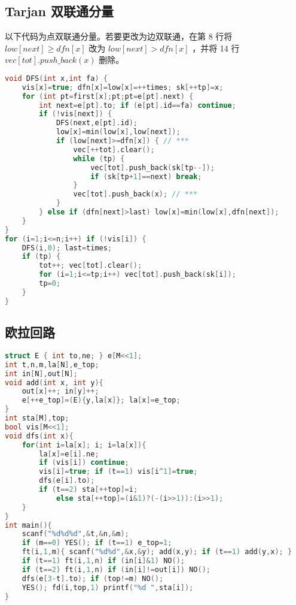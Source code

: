 \documentclass[landscape,a4paper]{article}
\begin{document}
\subsection{Tarjan 双联通分量}

以下代码为点双联通分量。若要更改为边双联通，在第 8 行将 $low[next] \geq dfn[x]$ 改为 $low[next] > dfn[x]$ ，并将 14 行 $vec[tot].push\_back(x)$ 删除。

\begin{lstlisting}[language=C++]
void DFS(int x,int fa) {
	vis[x]=true; dfn[x]=low[x]=++times; sk[++tp]=x;
	for (int pt=first[x];pt;pt=e[pt].next) {
		int next=e[pt].to; if (e[pt].id==fa) continue;
		if (!vis[next]) {
			DFS(next,e[pt].id);
			low[x]=min(low[x],low[next]);
			if (low[next]>=dfn[x]) { // ***
				vec[++tot].clear();
				while (tp) {
					vec[tot].push_back(sk[tp--]);
					if (sk[tp+1]==next) break;
				}
				vec[tot].push_back(x); // ***
			}
		} else if (dfn[next]>last) low[x]=min(low[x],dfn[next]);
	}
}
for (i=1;i<=n;i++) if (!vis[i]) {
	DFS(i,0); last=times;
	if (tp)	{
		tot++; vec[tot].clear();
		for (i=1;i<=tp;i++) vec[tot].push_back(sk[i]);
		tp=0;
	}
}
\end{lstlisting}

\subsection{欧拉回路}
\begin{lstlisting}[language=C++]
struct E { int to,ne; } e[M<<1];
int t,n,m,la[N],e_top;
int in[N],out[N];
void add(int x, int y){
	out[x]++; in[y]++;
	e[++e_top]=(E){y,la[x]}; la[x]=e_top;
}
int sta[M],top;
bool vis[M<<1];
void dfs(int x){
	for(int i=la[x]; i; i=la[x]){
		la[x]=e[i].ne;
		if (vis[i]) continue;
		vis[i]=true; if (t==1) vis[i^1]=true;		
		dfs(e[i].to);
		if (t==2) sta[++top]=i;
			else sta[++top]=(i&1)?(-(i>>1)):(i>>1);
	}
}
int main(){
	scanf("%d%d%d",&t,&n,&m);
	if (m==0) YES(); if (t==1) e_top=1;
	ft(i,1,m){ scanf("%d%d",&x,&y); add(x,y); if (t==1) add(y,x); }
	if (t==1) ft(i,1,n) if (in[i]&1) NO();
	if (t==2) ft(i,1,n) if (in[i]!=out[i]) NO();
	dfs(e[3-t].to); if (top!=m) NO();
	YES(); fd(i,top,1) printf("%d ",sta[i]);
}
\end{lstlisting}
\end{document}
